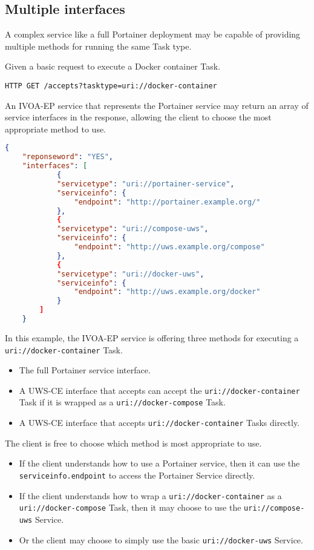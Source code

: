 \documentclass[11pt,a4paper]{ivoa}
\newcommand{\uwsce} {UWS-CE\xspace}
\newcommand{\ivoep} {IVOA-EP\xspace}
\newcommand{\docker} {Docker\xspace}
\newcommand{\portainer} {Portainer\xspace}
\newcommand{\codeword}[1] {\texttt{#1}}
\begin{document}
\subsection{Multiple interfaces}
\label{sec:multiple-interfaces}
A complex service like a full \portainer deployment may be capable of providing multiple methods for running the same Task type.

Given a basic request to execute a \docker container Task.
\begin{lstlisting}[]
    HTTP GET /accepts?tasktype=uri://docker-container
\end{lstlisting}

An \ivoep service that represents the \portainer service may return an array of service interfaces in the response, allowing the client to choose the most appropriate method to use.
\begin{lstlisting}[language=json]
    {
    "reponseword": "YES",
    "interfaces": [
            {
            "servicetype": "uri://portainer-service",
            "serviceinfo": {
                "endpoint": "http://portainer.example.org/"
            },
            {
            "servicetype": "uri://compose-uws",
            "serviceinfo": {
                "endpoint": "http://uws.example.org/compose"
            },
            {
            "servicetype": "uri://docker-uws",
            "serviceinfo": {
                "endpoint": "http://uws.example.org/docker"
            }
        ]
    }
\end{lstlisting}

In this example, the \ivoep service is offering three methods for executing a \codeword{uri://docker-container} Task.
\begin{itemize}
    \item The full \portainer service interface.
    \item A \uwsce interface that accepts can accept the \codeword{uri://docker-container} Task if it is wrapped as a \codeword{uri://docker-compose} Task.
    \item A \uwsce interface that accepts \codeword{uri://docker-container} Tasks directly.
\end{itemize}

The client is free to choose which method is most appropriate to use.
\begin{itemize}
    \item If the client understands how to use a \portainer service, then it can use the \codeword{serviceinfo.endpoint} to access the \portainer Service directly.
    \item If the client understands how to wrap a \codeword{uri://docker-container} as a \codeword{uri://docker-compose} Task, then it may choose to use the \codeword{uri://compose-uws} Service.
    \item Or the client may choose to simply use the basic \codeword{uri://docker-uws} Service.
\end{itemize}
\end{document}
